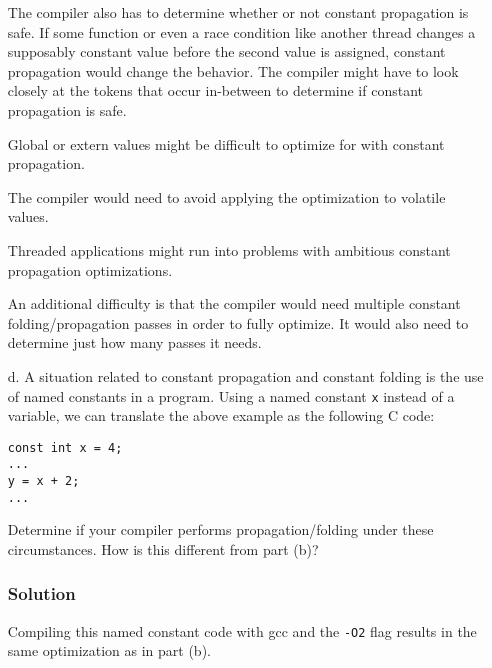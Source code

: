 \documentclass[12pt]{article}
\begin{document}
\begin{enumerate}
The compiler also has to determine whether or not constant propagation is safe. If some function or even a race condition like another thread changes a supposably constant value before the second value is assigned, constant propagation would change the behavior. The compiler might have to look closely at the tokens that occur in-between to determine if constant propagation is safe.

Global or extern values might be difficult to optimize for with constant propagation.

The compiler would need to avoid applying the optimization to volatile values.

Threaded applications might run into problems with ambitious constant propagation optimizations.

An additional difficulty is that the compiler would need multiple constant folding/propagation passes in order to fully optimize. It would also need to determine just how many passes it needs.

\item[d.] A situation related to constant propagation and constant folding is the use of named constants in a program. Using a named constant {\tt x} instead of a variable, we can translate the above example as the following C code:
\begin{verbatim}
const int x = 4;
...
y = x + 2;
...
\end{verbatim}
Determine if your compiler performs propagation/folding under these circumstances. How is this different from part (b)?
\subsubsection*{Solution}
Compiling this named constant code with gcc and the {\tt -O2} flag results in the same optimization as in part (b).
\end{enumerate}
\end{document}
